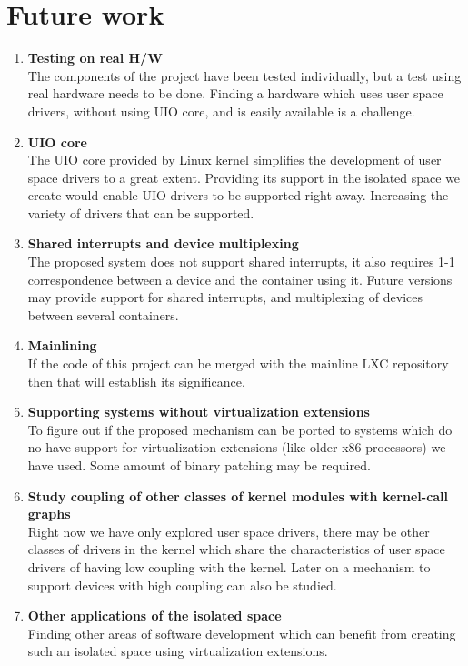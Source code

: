 \documentclass[twoside]{iitbreport}
\begin{document}
\chapter{Future work}
\begin{enumerate}
\item \textbf{Testing on real H/W}\\
The components of the project have been tested individually, but a test using real hardware needs to be done. Finding a hardware which uses user space drivers, without using UIO core, and is easily available is a challenge.

\item \textbf{UIO core}\\
The UIO core provided by Linux kernel simplifies the development of user space drivers to a great extent. Providing its support in the isolated space we create would enable UIO drivers to be supported right away. Increasing the variety of drivers that can be supported. 

\item \textbf{Shared interrupts and device multiplexing}\\
The proposed system does not support shared interrupts, it also requires 1-1 correspondence between a device and the container using it. Future versions may provide support for shared interrupts, and multiplexing of devices between several containers.

\item \textbf{Mainlining}\\
If the code of this project can be merged with the mainline LXC repository then that will establish its significance.

\item \textbf{Supporting systems without virtualization extensions}\\
To figure out if the proposed mechanism can be ported to systems which do no have support for virtualization extensions (like older x86 processors) we have used. Some amount of binary patching may be required.

\item \textbf{Study coupling of other classes of kernel modules with kernel-call graphs}\\
Right now we have only explored user space drivers, there may be other classes of drivers in the kernel which share the characteristics of user space drivers of having low coupling with the kernel. Later on a mechanism to support devices with high coupling can also be studied.

\item \textbf{Other applications of the isolated space}\\
Finding other areas of software development which can benefit from creating such an isolated space using virtualization extensions.

\end{enumerate}
\end{document}
